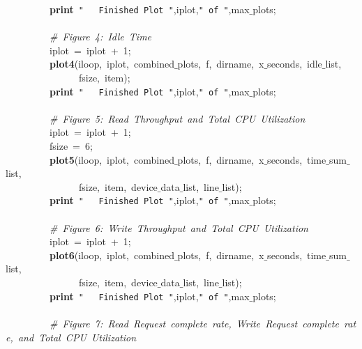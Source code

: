 \mbox{}\ \ \ \ \ \ \ \ \ \textbf{print}\ \texttt{"{}\ \ \ Finished\ Plot\ "{}},iplot,\texttt{"{}\ of\ "{}},max$\_$plots; \\
\mbox{}\ \ \ \ \ \ \ \ \  \\
\mbox{}\ \ \ \ \ \ \ \ \ \textit{\#\ Figure\ 4:\ Idle\ Time} \\
\mbox{}\ \ \ \ \ \ \ \ \ iplot\ =\ iplot\ +\ 1; \\
\mbox{}\ \ \ \ \ \ \ \ \ \textbf{plot4}(iloop,\ iplot,\ combined$\_$plots,\ f,\ dirname,\ x$\_$seconds,\ idle$\_$list, \\
\mbox{}\ \ \ \ \ \ \ \ \ \ \ \ \ \ \ fsize,\ item); \\
\mbox{}\ \ \ \ \ \ \ \ \ \textbf{print}\ \texttt{"{}\ \ \ Finished\ Plot\ "{}},iplot,\texttt{"{}\ of\ "{}},max$\_$plots; \\
\mbox{}\ \ \ \ \ \ \ \ \  \\
\mbox{}\ \ \ \ \ \ \ \ \ \textit{\#\ Figure\ 5:\ Read\ Throughput\ and\ Total\ CPU\ Utilization} \\
\mbox{}\ \ \ \ \ \ \ \ \ iplot\ =\ iplot\ +\ 1; \\
\mbox{}\ \ \ \ \ \ \ \ \ fsize\ =\ 6; \\
\mbox{}\ \ \ \ \ \ \ \ \ \textbf{plot5}(iloop,\ iplot,\ combined$\_$plots,\ f,\ dirname,\ x$\_$seconds,\ time$\_$sum$\_$list, \\
\mbox{}\ \ \ \ \ \ \ \ \ \ \ \ \ \ \ fsize,\ item,\ device$\_$data$\_$list,\ line$\_$list); \\
\mbox{}\ \ \ \ \ \ \ \ \ \textbf{print}\ \texttt{"{}\ \ \ Finished\ Plot\ "{}},iplot,\texttt{"{}\ of\ "{}},max$\_$plots; \\
\mbox{}\ \ \ \ \ \ \ \ \  \\
\mbox{}\ \ \ \ \ \ \ \ \ \textit{\#\ Figure\ 6:\ Write\ Throughput\ and\ Total\ CPU\ Utilization} \\
\mbox{}\ \ \ \ \ \ \ \ \ iplot\ =\ iplot\ +\ 1; \\
\mbox{}\ \ \ \ \ \ \ \ \ \textbf{plot6}(iloop,\ iplot,\ combined$\_$plots,\ f,\ dirname,\ x$\_$seconds,\ time$\_$sum$\_$list, \\
\mbox{}\ \ \ \ \ \ \ \ \ \ \ \ \ \ \ fsize,\ item,\ device$\_$data$\_$list,\ line$\_$list); \\
\mbox{}\ \ \ \ \ \ \ \ \ \textbf{print}\ \texttt{"{}\ \ \ Finished\ Plot\ "{}},iplot,\texttt{"{}\ of\ "{}},max$\_$plots; \\
\mbox{}\ \ \ \ \ \ \ \ \  \\
\mbox{}\ \ \ \ \ \ \ \ \ \textit{\#\ Figure\ 7:\ Read\ Request\ complete\ rate,\ Write\ Request\ complete\ rate,\ and\ Total\ CPU\ Utilization} \\
